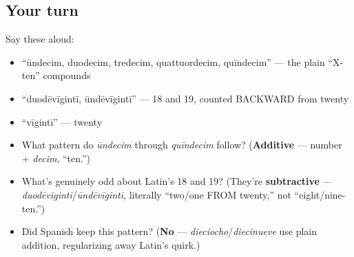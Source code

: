 \subsection*{Your turn}
Say these aloud:

\begin{itemize}
\raggedright
  \item \textquotedblleft{}ūndecim, duodecim, tredecim, quattuordecim, quīndecim\textquotedblright{} — the plain \textquotedblleft{}X-ten\textquotedblright{} compounds
  \item \textquotedblleft{}duodēvīgintī, ūndēvīgintī\textquotedblright{} — 18 and 19, counted BACKWARD from twenty
  \item \textquotedblleft{}vīgintī\textquotedblright{} — twenty
\end{itemize}

\begin{tcolorbox}[breakable,colback=teal!4,colframe=teal!35!black,title={Before you move on}]
\begin{itemize}
\raggedright
  \item What pattern do \emph{ūndecim} through \emph{quīndecim} follow? (\textbf{Additive} — number + \emph{decim}, \textquotedblleft{}ten.\textquotedblright{})
  \item What's genuinely odd about Latin's 18 and 19? (They're \textbf{subtractive} — \emph{duodēvīgintī}/\emph{ūndēvīgintī}, literally \textquotedblleft{}two/one FROM twenty,\textquotedblright{} not \textquotedblleft{}eight/nine-ten.\textquotedblright{})
  \item Did Spanish keep this pattern? (\textbf{No} — \emph{dieciocho}/\emph{diecinueve} use plain addition, regularizing away Latin's quirk.)
\end{itemize}
\end{tcolorbox}
